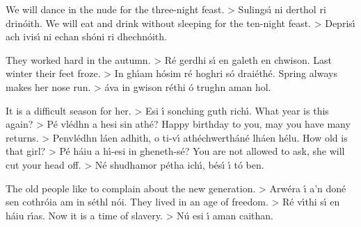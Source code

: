 We will dance in the nude for the three-night feast. > Sulings\'{\i} ni derthol ri drin\'{o}ith.
We will eat and drink without sleeping for the ten-night feast. > Depris\'{\i} ach ivis\'{\i} ni echan 
                                                                                                       sh\'{o}ni ri dhechn\'{o}ith.

They worked hard in the autumn. > R\'{e} gerdhi s\'{\i} en galeth en chwison.
Last winter their feet froze. > In gh\'{\i}am h\'{o}sim r\'{e} hoghri s\'{o} drai\'{e}th\'{e}.
Spring always makes her nose run. > \'{a}va in gwison r\'{e}thi \'{o} trughn aman hol.

It is a difficult season for her. > Esi \'{\i} sonching guth rich\'{\i}.
What year is this again? > P\'{e} vl\'{e}dhn a hesi sin ath\'{e}?
Happy birthday to you, may you have many returns. > Penvl\'{e}dhn l\'{a}en adhith, o ti-v\'{\i}  
                                                                                        ath\'{e}chwerth\'{a}n\'{e} lh\'{a}en h\'{e}lu.
How old is that girl? > P\'{e} h\'{a}iu a h\'{\i}-esi in gheneth-s\'{e}?
You are not allowed to ask, she will cut your head off. > N\'{e} shudhamor p\'{e}tha ich\'{\i}, b\'{e}s\'{\i} \'{\i} t\'{o} 
                                                                                           ben.

The old people like to complain about the new generation. > Arw\'{e}ra \'{\i} a’n don\'{e} sen cothr\'{o}ia 
                                                                                                  am in s\'{e}thl n\'{o}i.
They lived in an age of freedom. > R\'{e} v\'{\i}thi s\'{\i} en h\'{a}iu r\'{\i}as.
Now it is a time of slavery. > N\'{u} esi \'{\i} aman caithan.
